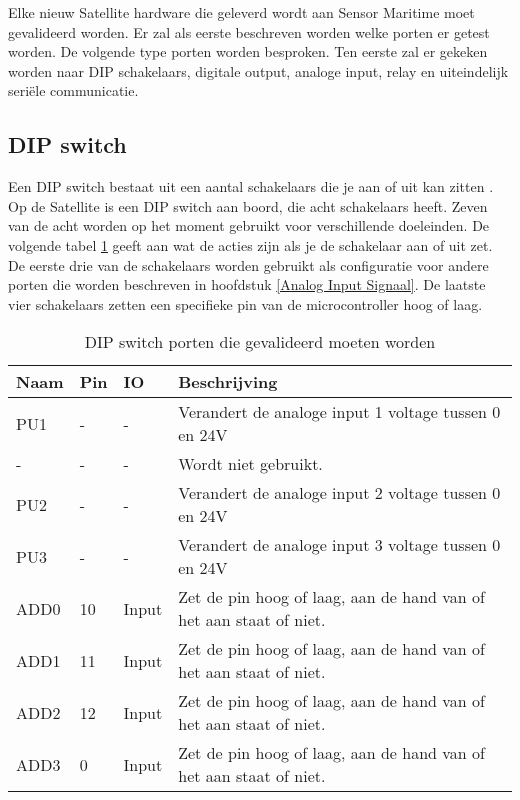 Elke nieuw Satellite hardware die geleverd wordt aan Sensor Maritime moet gevalideerd worden. Er zal als eerste beschreven worden welke porten er getest worden. De volgende type porten worden besproken. Ten eerste zal er gekeken worden naar DIP schakelaars, digitale output, analoge input, relay en uiteindelijk seriële communicatie.

\subsection{DIP switch}
Een DIP switch bestaat uit een aantal schakelaars die je aan of uit kan zitten \autocite{DIP}. Op de Satellite is een DIP switch aan boord, die acht schakelaars heeft. Zeven van de acht worden op het moment gebruikt voor verschillende doeleinden. De volgende tabel \ref{tab:hw_val_dip} geeft aan wat de acties zijn als je de schakelaar aan of uit zet. De eerste drie van de schakelaars worden gebruikt als configuratie voor andere porten die worden beschreven in hoofdstuk \ref{Analog Input Signaal}. De laatste vier schakelaars zetten een specifieke pin van de microcontroller hoog of laag.
\begin{table}[h!]
	\caption{DIP switch porten die gevalideerd moeten worden}
	\begin{tabular}{lllp{12cm}}
	\toprule
	\textbf{Naam} & \textbf{Pin} & \textbf{IO} & \textbf{Beschrijving}	\\ \toprule
	PU1		& - 	& -    		& Verandert de analoge input 1 voltage tussen 0 en 24V	\\
	-		& - 	& -    		& Wordt niet gebruikt.								\\
	PU2		& - 	& -    		& Verandert de analoge input 2 voltage tussen 0 en 24V	\\
	PU3		& - 	& -    		& Verandert de analoge input 3 voltage tussen 0 en 24V	\\
	ADD0 	& 10	& Input		& Zet de pin hoog of laag, aan de hand van of het aan staat of niet.		\\
	ADD1 	& 11	& Input		& Zet de pin hoog of laag, aan de hand van of het aan staat of niet.		\\
	ADD2 	& 12	& Input		& Zet de pin hoog of laag, aan de hand van of het aan staat of niet.		\\
	ADD3 	& 0 	& Input		& Zet de pin hoog of laag, aan de hand van of het aan staat of niet.		\\ \bottomrule
	\end{tabular}
	\label{tab:hw_val_dip}
\end{table}

